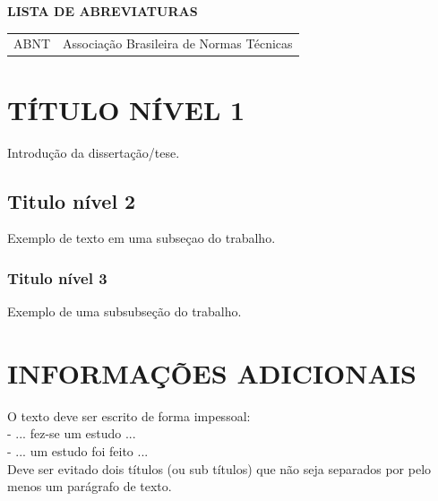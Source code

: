 \documentclass[a4paper,12pt,oneside]{article}
\numberwithin{equation}{section}
\begin{document}
\newpage
\thispagestyle{empty}
\begin{center}
	\textbf{\Large{LISTA DE ABREVIATURAS}}
\end{center}


\begin{changemargin}{1.5cm}{1.5cm} 
	\begin{tabular}{ll}
		ABNT 	&	Associação Brasileira de Normas Técnicas\\

	\end{tabular}
\end{changemargin}






\section{TÍTULO NÍVEL 1}

Introdução da dissertação/tese.


\subsection{Titulo nível 2}

Exemplo de texto em uma subseçao do trabalho.


\subsubsection{Titulo nível 3}

Exemplo de uma subsubseção do trabalho.


\section{INFORMAÇÕES ADICIONAIS}

O texto deve ser escrito de forma impessoal:\\

\noindent- ... fez-se um estudo ...\\
- ... um estudo foi feito ...\\



Deve ser evitado dois títulos (ou sub títulos) que não seja separados por pelo menos um
parágrafo de texto.
\end{document}
